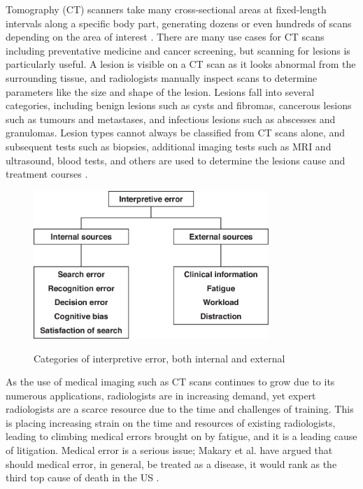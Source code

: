  Tomography (CT) scanners take many cross-sectional areas at fixed-length intervals along a specific body part, generating dozens or even hundreds of scans depending on the area of interest \cite{PMID:33620865}. There are many use cases for CT scans including preventative medicine and cancer screening, but scanning for lesions is particularly useful. A lesion is visible on a CT scan as it looks abnormal from the surrounding tissue, and radiologists manually inspect scans to determine parameters like the size and shape of the lesion. Lesions fall into several categories, including benign lesions such as cysts and fibromas, cancerous lesions such as tumours and metastases, and infectious lesions such as abscesses and granulomas. Lesion types cannot always be classified from CT scans alone, and subsequent tests such as biopsies, additional imaging tests such as MRI and ultrasound, blood tests, and others are used to determine the lesions cause and treatment courses \cite{oncology}.

\begin{figure}
 \begin{center}
 \includegraphics[width=3.5in]{images/scan_error.jpeg}\\
 \caption{Categories of interpretive error, both internal and external \cite{radiology_error}}\label{interpret_error}
 \end{center}
\end{figure}

As the use of medical imaging such as CT scans continues to grow due to its numerous applications, radiologists are in increasing demand, yet expert radiologists are a scarce resource due to the time and challenges of training. This is placing increasing strain on the time and resources of existing radiologists, leading to climbing medical errors brought on by fatigue, and it is a leading cause of litigation. Medical error is a serious issue; Makary et al. have argued that should medical error, in general, be treated as a disease, it would rank as the third top cause of death in the US \cite{medical_error}. 

